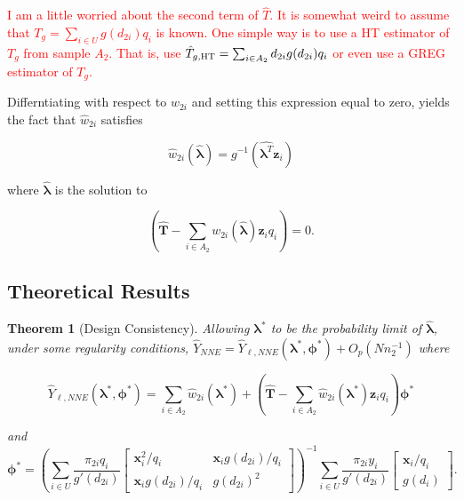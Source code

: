 \documentclass[12pt]{article}
\newtheorem{theorem}{Theorem}
\renewcommand{\bf}[1]{\mathbf{#1}}
\begin{document}
\textcolor{red}{I am a little worried about the second term of $\hat{T}$. It is
  somewhat weird to assume that $T_g= \sum_{i \in U} g(d_{2i}) q_i$ is known.
  One simple way is to use a HT estimator  of $T_g$ from sample $A_2$. That is,
  use $\hat{T}_{g, {\rm HT}} = \sum_{i \in A_2} d_{2i} g( d_{2i}) q_i$ or even
  use a GREG estimator of $T_g$. 
}

Differntiating with respect to $w_{2i}$ and setting this expression equal to
zero, yields the fact that $\hat w_{2i}$ satisfies 

$$ \hat w_{2i}(\hat{\bm \lambda}) = g^{-1}(\hat{\bm \lambda^T} \bf z_i) $$

where $\hat{\bm \lambda}$ is the solution to

\begin{equation}\label{eq:lamdc2}
  \left( \hat{\bf T} - \sum_{i \in A_2} w_{2i}(\hat{\bm \lambda}) \bf z_i
  q_i\right) = 0.
\end{equation}

\subsection{Theoretical Results}

\begin{theorem}[Design Consistency]\label{thm:dc2}
  Allowing $\bm \lambda^*$ to be the probability limit of $\hat{\bm \lambda}$,
  under some regularity conditions, $\hat Y_{NNE} = \hat Y_{\ell, NNE}(\bm \lambda^*,
  \bm \phi^*) + O_p(Nn_2^{-1})$ where

  $$\hat Y_{\ell, NNE}(\bm \lambda^*, \bm \phi^*) = \sum_{i \in A_2} \hat w_{2i}(
  \bm \lambda^*) + \left(\hat{\bf T} - \sum_{i \in A_2} \hat w_{2i}(
  \bm \lambda^*) \bf z_i q_i\right) \bm \phi^*$$

  and 
  $$\bm \phi^* =
  \left(\sum_{i \in U} \frac{\pi_{2i} q_i}{g'(d_{2i})} 
  \begin{bmatrix}
    \bf x_i^2 / q_i & \bf x_i g(d_{2i}) / q_i \\
    \bf x_i g(d_{2i}) / q_i & g(d_{2i})^2
  \end{bmatrix}
  \right)^{-1}
  \sum_{i \in U} \frac{\pi_{2i} y_i}{g'(d_{2i})} 
  \begin{bmatrix} \bf x_i / q_i \\ g(d_i) \end{bmatrix}.
  $$
\end{theorem}
\end{document}
